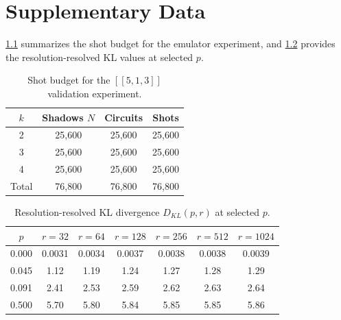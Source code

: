 \documentclass[12pt,a4paper,oneside]{book}
\theoremstyle{plain}
\theoremstyle{definition}
\theoremstyle{remark}
\begin{document}
\chapter{Supplementary Data}
\label{app:data}

\cref{tab:shot_budget} summarizes the shot budget for the emulator experiment, and \cref{tab:raw_kl} provides the resolution-resolved KL values at selected $p$.

\begin{table}[H]
\centering
\caption{Shot budget for the $[[5,1,3]]$ validation experiment.}
\label{tab:shot_budget}
\begin{tabular}{c|c|c|c}
\toprule
$k$ & Shadows $N$ & Circuits & Shots \\
\midrule
2 & 25{,}600 & 25{,}600 & 25{,}600 \\
3 & 25{,}600 & 25{,}600 & 25{,}600 \\
4 & 25{,}600 & 25{,}600 & 25{,}600 \\
\midrule
Total & 76{,}800 & 76{,}800 & 76{,}800 \\
\bottomrule
\end{tabular}
\end{table}

\begin{table}[H]
\centering
\caption{Resolution-resolved KL divergence $D_{KL}(p,r)$ at selected $p$.}
\label{tab:raw_kl}
\begin{tabular}{c|cccccc}
\toprule
$p$ & $r=32$ & $r=64$ & $r=128$ & $r=256$ & $r=512$ & $r=1024$ \\
\midrule
0.000  & 0.0031 & 0.0034 & 0.0037 & 0.0038 & 0.0038 & 0.0039 \\
0.045  & 1.12   & 1.19   & 1.24   & 1.27   & 1.28   & 1.29 \\
0.091  & 2.41   & 2.53   & 2.59   & 2.62   & 2.63   & 2.64 \\
0.500  & 5.70   & 5.80   & 5.84   & 5.85   & 5.85   & 5.86 \\
\bottomrule
\end{tabular}
\end{table}
\end{document}

